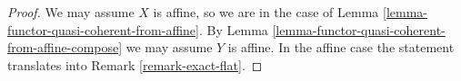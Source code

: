 \documentclass[10pt,a4paper]{amsart}
\theoremstyle{plain}
\theoremstyle{definition}
\theoremstyle{remark}
\numberwithin{equation}{subsection}
\begin{document}
\begin{proof}
We may assume $X$ is affine, so we are in the case of
Lemma \ref{lemma-functor-quasi-coherent-from-affine}.
By Lemma \ref{lemma-functor-quasi-coherent-from-affine-compose}
we may assume $Y$ is affine. In the affine case the statement
translates into Remark \ref{remark-exact-flat}.
\end{proof}
\end{document}
